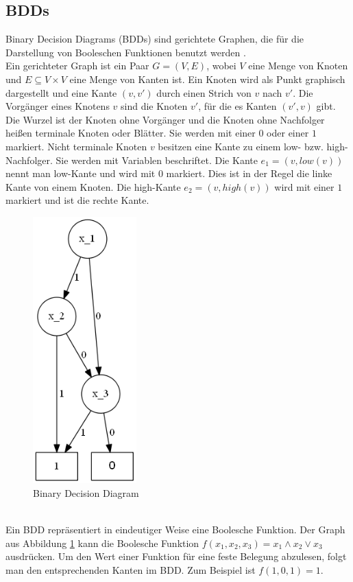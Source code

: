 \documentclass[a4,abstract=on]{scrartcl}
\begin{document}
\subsection{BDDs}
Binary Decision Diagrams (BDDs) sind gerichtete Graphen, die für die Darstellung von Booleschen Funktionen benutzt werden \cite[vgl.][Seite 109-110]{bdd}.\\
Ein gerichteter Graph ist ein Paar $G=(V, E)$, wobei $V$ eine Menge von Knoten und $E \subseteq V \times V$  eine Menge von Kanten ist. Ein Knoten wird als Punkt graphisch dargestellt und eine Kante $(v, v')$ durch einen Strich von $v$ nach $v'$. Die Vorgänger eines Knotens $v$ sind die Knoten $v'$, für die es Kanten $(v', v)$ gibt. Die Wurzel ist der Knoten ohne Vorgänger und die Knoten ohne Nachfolger heißen terminale Knoten oder Blätter. Sie werden mit einer $0$ oder einer $1$ markiert. Nicht terminale Knoten $v$ besitzen eine Kante zu einem low- bzw. high- Nachfolger. Sie werden mit Variablen beschriftet. Die Kante $e_1 = (v, low(v))$ nennt man low-Kante und wird mit $0$ markiert. Dies ist in der Regel die linke Kante von einem Knoten. Die high-Kante $e_2 = (v, high(v))$ wird mit einer $1$ markiert und ist die rechte Kante.

\begin{figure}[H]
\centering
\includegraphics[width=4cm]{bdd.png}
\caption{Binary Decision Diagram}
\label{fig:bdd}
\end{figure}
\ \\
Ein BDD repräsentiert in eindeutiger Weise eine Boolesche Funktion. Der Graph aus Abbildung \ref{fig:bdd} kann die Boolesche Funktion $f(x_1,x_2,x_3) = x_1\wedge x_2 \vee x_3$ ausdrücken. Um den Wert einer Funktion für eine feste Belegung abzulesen, folgt man den entsprechenden Kanten im BDD. Zum Beispiel ist $f(1,0,1)=1$.
\end{document}
